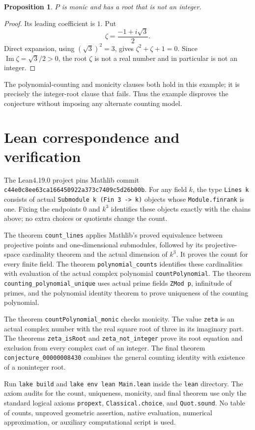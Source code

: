\documentclass[11pt]{article}
\newtheorem{proposition}{Proposition}
\begin{document}
\newpage
\begin{proposition}
$P$ is monic and has a root that is not an integer.
\end{proposition}
\begin{proof}
Its leading coefficient is $1$. Put
\[
 \zeta=\frac{-1+i\sqrt3}{2}.
\]
Direct expansion, using $(\sqrt3)^2=3$, gives
$\zeta^2+\zeta+1=0$. Since
$\operatorname{Im}\zeta=\sqrt3/2>0$, the root $\zeta$ is not a real
number and in particular is not an integer.
\end{proof}

The polynomial-counting and monicity clauses both hold in this example;
it is precisely the integer-root clause that fails. Thus the example
disproves the conjecture without imposing any alternate counting model.

\section{Lean correspondence and verification}
\raggedright
The Lean4.19.0 project pins Mathlib commit
\texttt{c44e0c8ee63ca166450922a373c7409c5d26b00b}.
For any field $k$, the type \texttt{Lines k} consists of actual
\texttt{Submodule k (Fin 3 -> k)} objects whose \texttt{Module.finrank}
is one. Fixing the endpoints $0$ and $k^3$ identifies these objects
exactly with the chains above; no extra choices or quotients change
the count.

The theorem \texttt{count\_lines} applies Mathlib's proved equivalence
between projective points and one-dimensional submodules, followed by
its projective-space cardinality theorem and the actual dimension of
$k^3$. It proves the count for every finite field. The theorem
\texttt{polynomial\_counts} identifies these cardinalities with
evaluation of the actual complex polynomial \texttt{countPolynomial}.
The theorem \texttt{counting\_polynomial\_unique} uses actual prime
fields \texttt{ZMod p}, infinitude of primes, and the polynomial
identity theorem to prove uniqueness of the counting polynomial.

The theorem \texttt{countPolynomial\_monic} checks monicity.
The value \texttt{zeta} is an actual complex number with the real square
root of three in its imaginary part. The theorems
\texttt{zeta\_isRoot} and \texttt{zeta\_not\_integer} prove its root
equation and exclusion from every complex cast of an integer.
The final theorem \texttt{conjecture\_00000008430} combines the
general counting identity with existence of a noninteger root.

Run \texttt{lake build} and \texttt{lake env lean Main.lean} inside
the \texttt{lean} directory. The axiom audits for the count, uniqueness,
monicity, and final theorem use only the standard logical axioms
\texttt{propext}, \texttt{Classical.choice}, and \texttt{Quot.sound}.
No table of counts, unproved geometric assertion, native evaluation,
numerical approximation, or auxiliary computational script is used.
\end{document}
